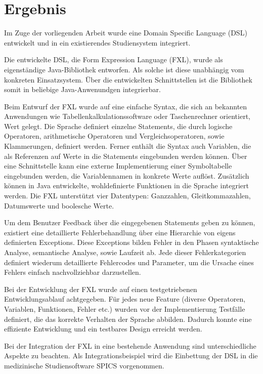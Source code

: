 
\chapter{Ergebnis}
\label{chapter_ergebnis}

Im Zuge der vorliegenden Arbeit wurde eine Domain Specific Language (DSL) entwickelt und in ein existierendes Studiensystem integriert.

Die entwickelte DSL, die Form Expression Language (FXL), wurde als eigenständige Java-Bibliothek entworfen. Als solche ist diese unabhängig vom konkreten Einsatzsystem. Über die entwickelten Schnittstellen ist die Bibliothek somit in beliebige Java-Anwenundgen integrierbar.

Beim Entwurf der FXL wurde auf eine einfache Syntax, die sich an bekannten Anwendungen wie Tabellenkalkulationssoftware oder Taschenrechner orientiert, Wert gelegt. Die Sprache definiert einzelne Statements, die durch logische Operatoren, arithmetische Operatoren und Vergleichsoperatoren, sowie Klammerungen, definiert werden. Ferner enthält die Syntax auch Variablen, die als Referenzen auf Werte  in die Statements eingebunden werden können. Über eine Schnittstelle kann eine externe Implementierung einer Symboltabelle eingebunden werden, die Variablennamen in konkrete Werte auflöst. Zusätzlich können in Java entwickelte, wohldefinierte Funktionen in die Sprache integriert werden. Die FXL unterstützt vier Datentypen: Ganzzahlen, Gleitkommazahlen, Datumswerte und boolesche Werte.

Um dem Benutzer Feedback über die eingegebenen Statements geben zu können, existiert eine detaillierte Fehlerbehandlung über eine Hierarchie von eigens definierten Exceptions. Diese Exceptions bilden Fehler in den Phasen syntaktische Analyse, semantische Analyse, sowie Laufzeit ab. Jede dieser Fehlerkategorien definiert wiederum detaillierte Fehlercodes und Parameter, um die Ursache eines Fehlers einfach nachvollziehbar darzustellen.

Bei der Entwicklung der FXL wurde auf einen testgetriebenen Entwicklungsablauf achtgegeben. Für jedes neue Feature (diverse Operatoren, Variablen, Funktionen, Fehler etc.) wurden vor der Implementierung Testfälle definiert, die das korrekte Verhalten der Sprache abbilden. Dadurch konnte eine effiziente Entwicklung und ein testbares Design erreicht werden.

Bei der Integration der FXL in eine bestehende Anwendung sind unterschiedliche Aspekte zu beachten. Als Integrationsbeispiel wird die Einbettung der DSL in die medizinische Studiensoftware SPICS vorgenommen.

